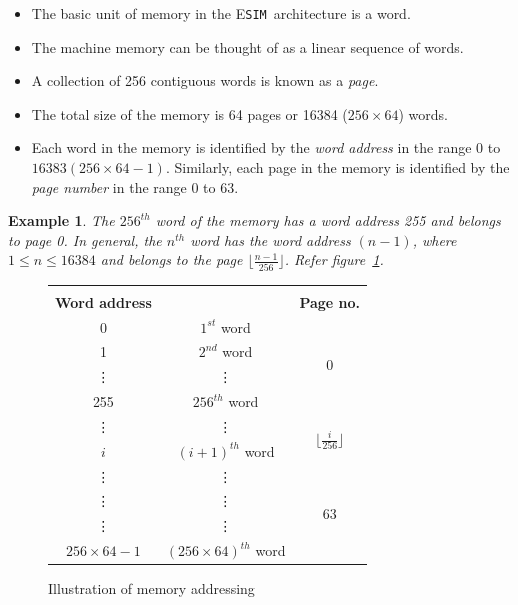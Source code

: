 \documentclass[11pt]{report}
\newtheorem{example}{Example}[section]
\newcommand{\ESIM}{\textsc{E}\small{\texttt{SIM}}~}
\begin{document}
\begin{itemize}
	\item The basic unit of memory in the \ESIM architecture is a word. 
	\item The machine memory can be thought of as a linear sequence of words.
	\item A collection of 256 contiguous words is known as a \emph{page}. 
	\item The total size of the memory is 64 pages or 16384 ($256 \times 64$) words.
	\item Each word in the memory is identified by the \emph{word address} in the range 0 to $16383(256 \times 64 - 1)$. Similarly, each page in the memory is identified by the \emph{page number}  in the range 0 to 63.
\end{itemize}

\begin{example}
	The $256^{th}$ word of the memory has a word address 255 and belongs to page 0. In general, the $n^{th}$ word has the word address $(n-1)$, where  $1 \le n \le 16384$ and belongs to the page $\lfloor \frac{n-1}{256} \rfloor$. Refer figure~\ref{fig:mem_struct}. 
\end{example}

\begin{figure}[htp!] \small
	\centering
	\begin{tabular}{c|c|c|} 
		\multicolumn{3}{c}{} \\
		\textbf{Word address} &  & \textbf{Page no.} \\ \cline{2-3}
		0 & $1^{st}$ word & \multirow{4}{*}{$0$} \\ \cline{2-2}
		1 & $2^{nd}$ word &  \\ \cline{2-2}
		\vdots & \vdots & \\ \cline{2-2}
		255 & $256^{th}$ word &  \\ \cline{2-3}
	
		\vdots & \vdots & \multirow{2}{*}{$\lfloor \frac{i}{256} \rfloor $} \\ \cline{2-2}
		$i$ & $(i+1)^{th} $ word &  \\ \cline{2-2}
		\vdots &\vdots &  \\ \cline{2-3}
	
		\vdots & \vdots & \multirow{2}{*}{$63$} \\ \cline{2-2}
		\vdots &\vdots &  \\ \cline{2-2}
		$256 \times 64 - 1$ & $(256 \times 64)^{th} $ word &  \\ \cline{2-3}
	\end{tabular}
	\caption{Illustration of memory addressing}
	\label{fig:mem_struct}
\end{figure}
\end{document}
